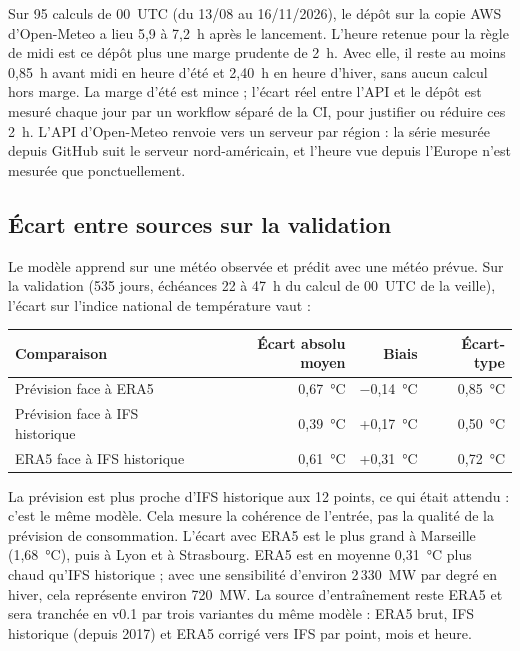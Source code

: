 \documentclass[11pt,a4paper]{article}
\begin{document}
Sur 95 calculs de 00~UTC (du 13/08 au 16/11/2026), le dépôt sur la copie AWS d'Open-Meteo a lieu 5,9 à 7,2~h après le lancement. L'heure retenue pour la règle de midi est ce dépôt plus une marge prudente de 2~h. Avec elle, il reste au moins 0,85~h avant midi en heure d'été et 2,40~h en heure d'hiver, sans aucun calcul hors marge. La marge d'été est mince ; l'écart réel entre l'API et le dépôt est mesuré chaque jour par un workflow séparé de la CI, pour justifier ou réduire ces 2~h. L'API d'Open-Meteo renvoie vers un serveur par région : la série mesurée depuis GitHub suit le serveur nord-américain, et l'heure vue depuis l'Europe n'est mesurée que ponctuellement.

\subsection{Écart entre sources sur la validation}

Le modèle apprend sur une météo observée et prédit avec une météo prévue. Sur la validation (535 jours, échéances 22 à 47~h du calcul de 00~UTC de la veille), l'écart sur l'indice national de température vaut :

\begin{table}[H]
\small
\begin{tabularx}{\linewidth}{Yrrr}
\toprule
\textbf{Comparaison} & \textbf{Écart absolu moyen} & \textbf{Biais} & \textbf{Écart-type} \\
\midrule
Prévision face à ERA5 & 0,67~°C & −0,14~°C & 0,85~°C \\
Prévision face à IFS historique & 0,39~°C & +0,17~°C & 0,50~°C \\
ERA5 face à IFS historique & 0,61~°C & +0,31~°C & 0,72~°C \\
\bottomrule
\end{tabularx}
\end{table}

La prévision est plus proche d'IFS historique aux 12 points, ce qui était attendu : c'est le même modèle. Cela mesure la cohérence de l'entrée, pas la qualité de la prévision de consommation. L'écart avec ERA5 est le plus grand à Marseille (1,68~°C), puis à Lyon et à Strasbourg. ERA5 est en moyenne 0,31~°C plus chaud qu'IFS historique ; avec une sensibilité d'environ 2\,330~MW par degré en hiver, cela représente environ 720~MW. La source d'entraînement reste ERA5 et sera tranchée en v0.1 par trois variantes du même modèle : ERA5 brut, IFS historique (depuis 2017) et ERA5 corrigé vers IFS par point, mois et heure.
\end{document}
